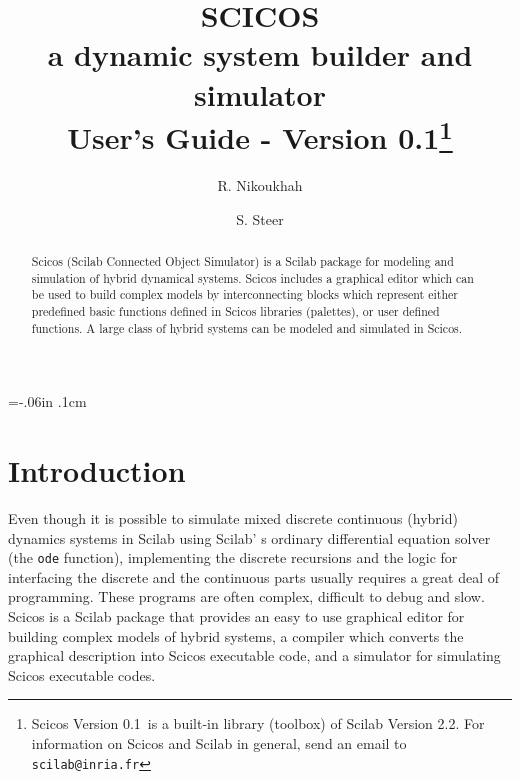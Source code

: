 \textwidth=6.5in
\textheight=8.5in 
\oddsidemargin=-.06in
\evensidemargin=0in
\topmargin=-0in
\parskip.1cm
\newcommand{\version}{Version 0.1}
\newcommand{\sciversion}{Version 2.2}

\renewcommand{\theequation}{\thesection.\arabic{equation}\alph{acount}}

\title{{\bf SCICOS}\\[.1cm]
{\bf a dynamic system builder and simulator}\\[.4cm]
User's Guide - \version \thanks{Scicos \version\ is a built-in library
(toolbox) of Scilab \sciversion. For information on Scicos and Scilab in
general, send an email to {\tt scilab@inria.fr}}}
\author{R. Nikoukhah \and S. Steer}
\date{}

\maketitle

\begin{abstract}
Scicos  (Scilab Connected Object Simulator) is a Scilab package for
modeling and simulation of hybrid dynamical systems. Scicos includes a
graphical editor which can be used to build complex models 
by interconnecting
blocks which represent either predefined basic functions defined in Scicos 
libraries (palettes), or user defined functions. A large class of hybrid 
systems can be modeled and simulated in Scicos. 
\end{abstract}


\newpage
\tableofcontents

\setcounter{equation}{0}
\section{Introduction}
Even though it is possible to simulate mixed discrete
continuous (hybrid) dynamics systems in Scilab using Scilab' s ordinary
differential equation solver (the {\tt ode}
function), implementing the discrete  recursions and the logic for
interfacing the discrete and the continuous parts usually
requires a great deal of programming. These programs are often
complex, difficult to debug and slow. Scicos is a Scilab package
that provides an easy to use graphical editor for building complex
models of hybrid systems, a compiler which converts the graphical
description into Scicos executable code, and a simulator for
simulating Scicos   executable codes. 

